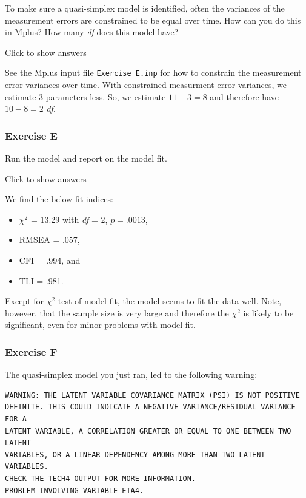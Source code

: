 \documentclass[
]{book}
\providecommand{\tightlist}{%
  \setlength{\itemsep}{0pt}\setlength{\parskip}{0pt}}
\begin{document}
To make sure a quasi-simplex model is identified, often the variances of the measurement errors are constrained to be equal over time. How can you do this in Mplus? How many \emph{df} does this model have?

Click to show answers

See the Mplus input file \texttt{Exercise\ E.inp} for how to constrain the measurement error variances over time. With constrained measurment error variances, we estimate 3 parameters less. So, we estimate \(11 - 3 = 8\) and therefore have \(10 - 8 = 2\) \emph{df}.

\hypertarget{exercise-e}{%
\subsubsection*{Exercise E}\label{exercise-e}}

Run the model and report on the model fit.

Click to show answers

We find the below fit indices:

\begin{itemize}
\tightlist
\item
  \(\chi^{2}\) = 13.29 with \emph{df} = 2, \(p = .0013\),
\item
  RMSEA = .057,
\item
  CFI = .994, and
\item
  TLI = .981.
\end{itemize}

Except for \(\chi^{2}\) test of model fit, the model seems to fit the data well. Note, however, that the sample size is very large and therefore the \(\chi^{2}\) is likely to be significant, even for minor problems with model fit.

\hypertarget{exercise-f}{%
\subsubsection*{Exercise F}\label{exercise-f}}

The quasi-simplex model you just ran, led to the following warning:

\begin{verbatim}
WARNING: THE LATENT VARIABLE COVARIANCE MATRIX (PSI) IS NOT POSITIVE
DEFINITE. THIS COULD INDICATE A NEGATIVE VARIANCE/RESIDUAL VARIANCE FOR A
LATENT VARIABLE, A CORRELATION GREATER OR EQUAL TO ONE BETWEEN TWO LATENT
VARIABLES, OR A LINEAR DEPENDENCY AMONG MORE THAN TWO LATENT VARIABLES.
CHECK THE TECH4 OUTPUT FOR MORE INFORMATION.
PROBLEM INVOLVING VARIABLE ETA4.
\end{verbatim}
\end{document}
